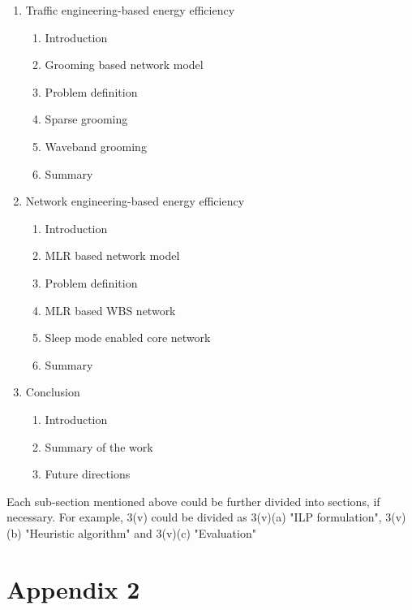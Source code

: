 \documentclass{article}
\begin{document}
\begin{enumerate}
\item Traffic engineering-based energy efficiency
\begin{enumerate}[i]
\item Introduction
\item Grooming based network model
\item Problem definition
\item Sparse grooming 
\item Waveband grooming 
\item Summary
\end{enumerate}
\item Network engineering-based energy efficiency \begin{enumerate}[i]
\item Introduction
\item MLR based network model
\item Problem definition
\item MLR based WBS network
\item Sleep mode enabled core network
\item Summary
\end{enumerate}
\item Conclusion
\begin{enumerate}[i]
\item Introduction
\item Summary of the work
\item Future directions
\end{enumerate}
\end{enumerate}
Each sub-section mentioned above could be further divided into sections, if necessary. For example, 3(v) could be divided as 3(v)(a) "ILP formulation", 3(v)(b) "Heuristic algorithm" and 3(v)(c) "Evaluation"
\newpage
\centering
\vspace*{2.5in}
\section*{\LARGE Appendix 2}

\end{document}
